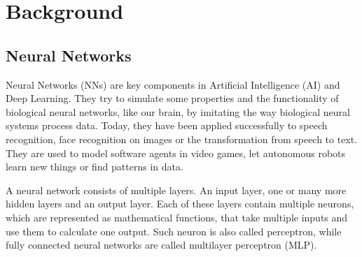 \chapter{Background}

  \section{Neural Networks}

    Neural Networks (NNs) are key components in Artificial Intelligence (AI) and Deep Learning.
    They try to simulate some properties and the functionality of biological neural networks, like our brain, by imitating the way biological neural systems process data.
    Today, they have been applied successfully to speech recognition, face recognition on images or the transformation from speech to text.
    They are used to model software agents in video games, let autonomous robots learn new things or find patterns in data.

    A neural network consists of multiple layers.
    An input layer, one or many more hidden layers and an output layer.
    Each of these layers contain multiple neurons, which are represented as mathematical functions, that take multiple inputs and use them to calculate one output.
    Such neuron is also called perceptron, while fully connected neural networks are called multilayer perceptron (MLP).

